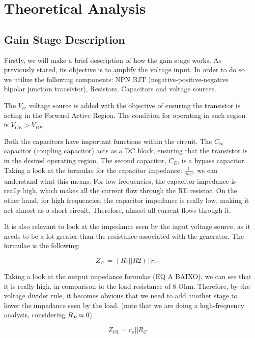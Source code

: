 \section{Theoretical Analysis}
\label{Teorica}
\subsection{Gain Stage Description}

Firstly, we will make a brief description of how the gain stage works. As previously stated, its objective is to amplify the voltage input. In order to do so we utilize the following components: NPN BJT (negative-positive-negative bipolar junction transistor), Resistors, Capacitors and voltage sources.

The $V_{cc}$ voltage source is added with the objective of ensuring the transistor is acting in the Forward Active Region. The condition for operating in such region is $V_{CE}>V_{BE}$.

Both the capacitors have important functions within the circuit. The $C_{in}$ capacitor (coupling capacitor) acts as a DC block, ensuring that the transistor is in the desired operating region. The second capacitor, $C_E$, is a bypass capacitor. Taking a look at the formulae for the capacitor impedance: $\frac{1}{jwc}$, we can understand what this means. For low frequencies, the capacitor impedance is really high, which makes all the current flow through the RE resistor. On the other hand, for high frequencies, the capacitor impedance is really low, making it act almost as a short circuit. Therefore, almost all current flows through it.

It is also relevant to look at the impedance seen by the input voltage source, as it needs to be a lot greater than the resistance associated with the generator. The formulae is the following:

\begin{equation}
    Z_{I1}= (R_1 || R2) || r_{\pi 1}
\end{equation}


Taking a look at the output impedance formulae (EQ A BAIXO), we can see that it is really high, in comparison to the load resistance of 8 Ohm. Therefore, by the voltage divider rule, it becomes obvious that we need to add another stage to lower the impedance seen by the load. (note that we are doing a high-frequency analysis, considering $R_E \simeq 0$)

\begin{equation}
     Z_{O1}=r_o || R_C
\end{equation}

